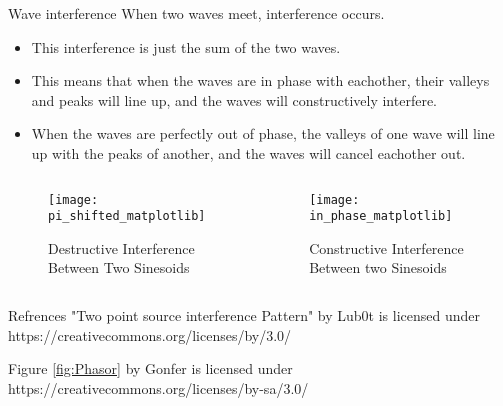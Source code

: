 \documentclass[aspectratio=169]{beamer}
\begin{document}
				
\begin{frame}{Wave interference}
	When two waves meet, interference occurs.
	\begin{itemize}
		\item This interference is just the sum of the two waves.
		\item This means that when the waves are in phase with eachother, their valleys and peaks will line up, and the waves will constructively interfere.
		\item When the waves are perfectly out of phase, the valleys of one wave will line up with the peaks of another, and the waves will cancel eachother out.
	\end{itemize}
							
								
	\begin{columns}[c]	
		\begin{column}{.5\textwidth}
			\begin{figure}
				\texttt{[image: pi\_shifted\_matplotlib]}
				\caption{Destructive Interference Between Two Sinesoids}
			\end{figure}
		\end{column}
											
										
											
		\begin{column}{.5\textwidth}
			\begin{figure}
				\texttt{[image: in\_phase\_matplotlib]}
				\caption{Constructive Interference Between two Sinesoids}
			\end{figure}
		\end{column}
	\end{columns}
							
\end{frame}
				
\begin{frame}{Refrences}
	"Two point source interference Pattern" by Lub0t is licensed under https://creativecommons.org/licenses/by/3.0/
							
							
	Figure \ref{fig:Phasor} by Gonfer is licensed under https://creativecommons.org/licenses/by-sa/3.0/
							
							
\end{frame}
				
\end{document}
